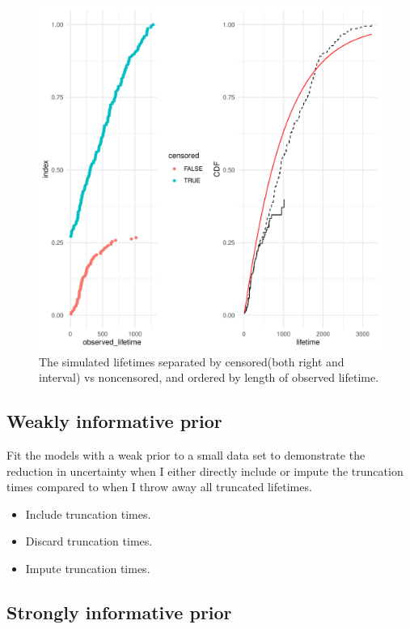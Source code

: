 \begin{figure}
    \centering
    \includegraphics[width=1\textwidth]{./figures/sim_data_desc.pdf}
    \caption{The simulated lifetimes separated by censored(both right and interval) vs noncensored, and ordered by length of observed lifetime.}
    \label{fig:sim_censored_units}
\end{figure}



\subsection{Weakly informative prior}

Fit the models with a weak prior to a small data set to demonstrate the reduction in uncertainty when I either directly include or impute the truncation times compared to when I throw away all truncated lifetimes.
\begin{itemize}
    \item Include truncation times.
    \item Discard truncation times.
    \item Impute truncation times.
\end{itemize}

\subsection{Strongly informative prior}

